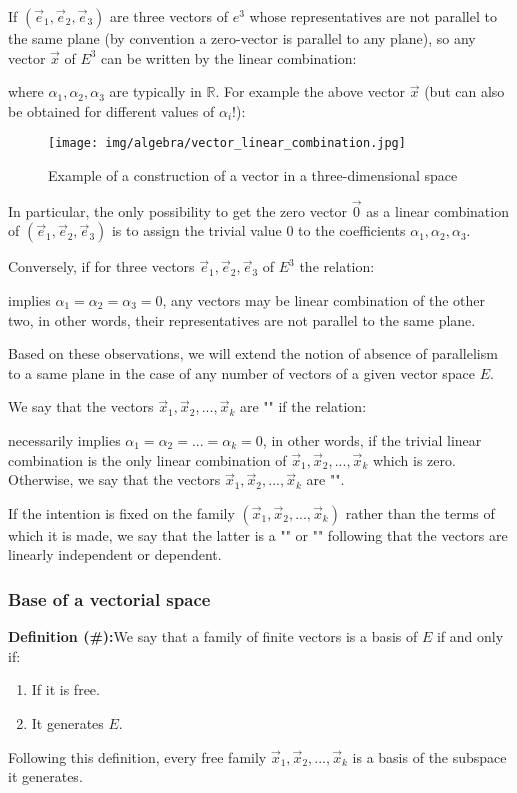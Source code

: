 	If $(\vec{e}_1,\vec{e}_2,\vec{e}_3)$ are three vectors of $e^3$ whose representatives are not parallel to the same plane (by convention a zero-vector is parallel to any plane), so any vector $\vec{x}$ of $E^3$ can be written by the linear combination:
	
	where $\alpha_1,\alpha_2,\alpha_3$ are typically in $\mathbb{R}$.
	For example the above vector $\vec{x}$ (but can also be obtained for different values of $\alpha_i$!):
	\begin{figure}[H]
		\centering
		\texttt{[image: img/algebra/vector\_linear\_combination.jpg]}
		\caption{Example of a construction of a vector in a three-dimensional space}
	\end{figure}
	In particular, the only possibility to get the zero vector $\vec{0}$ as a linear combination of $(\vec{e}_1,\vec{e}_2,\vec{e}_3)$ is to assign the trivial value $0$ to the coefficients $\alpha_1,\alpha_2,\alpha_3$.

	Conversely, if for three vectors  $\vec{e}_1,\vec{e}_2,\vec{e}_3$ of $E^3$ the relation:
		
	implies $\alpha_1=\alpha_2=\alpha_3=0$, any vectors may be linear combination of the other two, in other words, their representatives are not parallel to the same plane.
	
	Based on these observations, we will extend the notion of absence of parallelism to a same plane in the case of any number of vectors of a given vector space $E$.
	
	We say that the vectors $\vec{x}_1,\vec{x}_2,...,\vec{x}_k$ are "" if the relation:
	
	necessarily implies  $\alpha_1=\alpha_2=...=\alpha_k=0$, in other words, if the trivial linear combination is the only linear combination of $\vec{x}_1,\vec{x}_2,...,\vec{x}_k$ which is zero. Otherwise, we say that the vectors $\vec{x}_1,\vec{x}_2,...,\vec{x}_k$ are "".
	
	If the intention is fixed on the family $(\vec{x}_1,\vec{x}_2,...,\vec{x}_k)$ rather than the terms of which it is made, we say that the latter is a "" or "" following that the vectors are linearly independent or dependent.
	
	\subsubsection{Base of a vectorial space}
	\textbf{Definition (\#\mydef):}We say that a family of finite vectors is a basis of $E$ if and only if:
	\begin{enumerate}
		\item If it is free.
		
		\item It generates $E$.
	\end{enumerate}
	Following this definition, every free family $\vec{x}_1,\vec{x}_2,...,\vec{x}_k$ is a basis of the subspace it generates.
	
